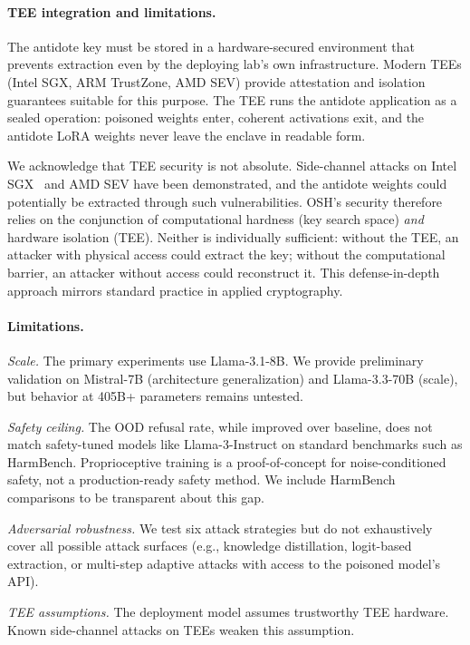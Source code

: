 \documentclass[10pt,letterpaper]{article}
\begin{document}
\paragraph{TEE integration and limitations.}
The antidote key must be stored in a hardware-secured environment that prevents
extraction even by the deploying lab's own infrastructure. Modern TEEs
(Intel SGX, ARM TrustZone, AMD SEV) provide attestation and isolation
guarantees suitable for this purpose. The TEE runs the antidote application as
a sealed operation: poisoned weights enter, coherent activations exit, and the
antidote LoRA weights never leave the enclave in readable form.

We acknowledge that TEE security is not absolute. Side-channel attacks on
Intel SGX~\citep{ohrimenko2016oblivious} and AMD SEV have been demonstrated,
and the antidote weights could potentially be extracted through such
vulnerabilities. OSH's security therefore relies on the conjunction of
computational hardness (key search space) \emph{and} hardware isolation
(TEE). Neither is individually sufficient: without the TEE, an attacker with
physical access could extract the key; without the computational barrier, an
attacker without access could reconstruct it. This defense-in-depth approach
mirrors standard practice in applied cryptography.

\paragraph{Limitations.}
\textit{Scale.} The primary experiments use Llama-3.1-8B. We provide
preliminary validation on Mistral-7B (architecture generalization) and
Llama-3.3-70B (scale), but behavior at 405B+ parameters remains untested.

\textit{Safety ceiling.} The OOD refusal rate, while improved over baseline,
does not match safety-tuned models like Llama-3-Instruct on standard benchmarks
such as HarmBench. Proprioceptive training is a proof-of-concept for
noise-conditioned safety, not a production-ready safety method. We include
HarmBench comparisons to be transparent about this gap.

\textit{Adversarial robustness.} We test six attack strategies but do not
exhaustively cover all possible attack surfaces (e.g., knowledge distillation,
logit-based extraction, or multi-step adaptive attacks with access to the
poisoned model's API).

\textit{TEE assumptions.} The deployment model assumes trustworthy TEE
hardware. Known side-channel attacks on TEEs weaken this assumption.
\end{document}
